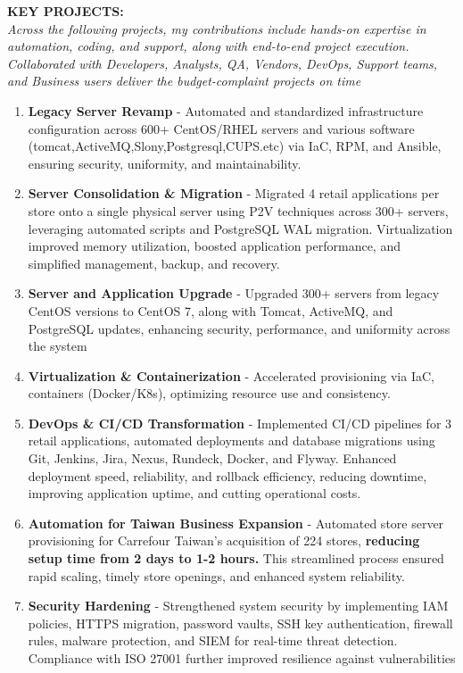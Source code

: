 \documentclass[11pt]{article}
\begin{document}
	\textbf{KEY PROJECTS:}\\
	\textit{Across the following projects, my contributions include hands-on expertise in automation, coding, and support, along with end-to-end project execution. Collaborated with Developers, Analysts, QA, Vendors, DevOps, Support teams, and Business users deliver the budget-complaint projects on time}
	\begin{enumerate}
		\item \textbf{Legacy Server Revamp} - Automated and standardized infrastructure configuration across 600+ CentOS/RHEL servers and various software (tomcat,ActiveMQ,Slony,Postgresql,CUPS.etc) via IaC, RPM, and Ansible, ensuring security, uniformity, and maintainability.
		\item \textbf{Server Consolidation \& Migration} - Migrated 4 retail applications per store onto a single physical server using P2V techniques across 300+ servers, leveraging automated scripts and PostgreSQL WAL migration. Virtualization improved memory utilization, boosted application performance, and simplified management, backup, and recovery. 
		\item \textbf{Server and Application Upgrade} - Upgraded 300+ servers from legacy CentOS versions to CentOS 7, along with Tomcat, ActiveMQ, and PostgreSQL updates, enhancing security, performance, and uniformity across the system
		\item \textbf{Virtualization \& Containerization} - Accelerated provisioning via IaC, containers (Docker/K8s), optimizing resource use and consistency.
		\item \textbf{DevOps \& CI/CD Transformation} - Implemented CI/CD pipelines for 3 retail applications, automated deployments and database migrations using Git, Jenkins, Jira, Nexus, Rundeck, Docker, and Flyway. Enhanced deployment speed, reliability, and rollback efficiency, reducing downtime, improving application uptime, and cutting operational costs.
		\item \textbf{Automation for Taiwan Business Expansion} - Automated store server provisioning for Carrefour Taiwan's acquisition of 224 stores, \textbf{reducing setup time from 2 days to 1-2 hours.} This streamlined process ensured rapid scaling, timely store openings, and enhanced system reliability.
		\item \textbf{Security Hardening} - Strengthened system security by implementing IAM policies, HTTPS migration, password vaults, SSH key authentication, firewall rules, malware protection, and SIEM for real-time threat detection. Compliance with ISO 27001 further improved resilience against vulnerabilities

\end{enumerate}
\end{document}
